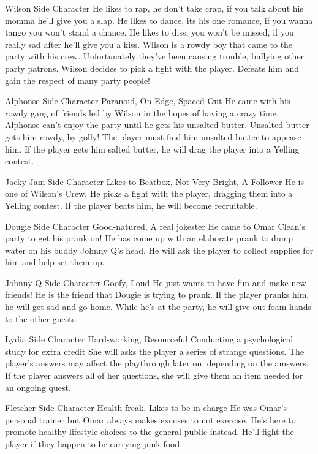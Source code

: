{Wilson}
{Side Character}
{He likes to rap, he don't take crap, if you talk about his momma he'll give you a slap. He likes to dance, its his one romance, if you wanna tango you won't stand a chance. He likes to diss, you won't be missed, if you really sad after he'll give you a kiss.}
{Wilson is a rowdy boy that came to the party with his crew. Unfortunately they've been causing trouble, bullying other party patrons.}
{Wilson decides to pick a fight with the player. Defeats him and gain the respect of many party people!}

{Alphonse}
{Side Character}
{Paranoid, On Edge, Spaced Out}
{He came with his rowdy gang of friends led by Wilson in the hopes of having a crazy time.}
{Alphonse can't enjoy the party until he gets his unsalted butter. Unsalted butter gets him rowdy, by golly! The player must find him unsalted butter to appease him. If the player gets him salted butter, he will drag the player into a Yelling contest.}

{Jacky-Jam}
{Side Character}
{Likes to Beatbox, Not Very Bright, A Follower}
{He is one of Wilson's Crew.}
{He picks a fight with the player, dragging them into a Yelling contest. If the player beats him, he will become recruitable.}

{Dougie}
{Side Character}
{Good-natured, A real jokester}
{He came to Omar Clean's party to get his prank on!}
{He has come up with an elaborate prank to dump water on his buddy Johnny Q's head. He will ask the player to collect supplies for him and help set them up.}

{Johnny Q}
{Side Character}
{Goofy, Loud}
{He just wants to have fun and make new friends!}
{He is the friend that Dougie is trying to prank. If the player pranks him, he will get sad and go home. While he's at the party, he will give out foam hands to the other guests.}

{Lydia}
{Side Character}
{Hard-working, Resourceful}
{Conducting a psychological study for extra credit}
{She will asks the player a series of strange questions. The player's answers may affect the playthrough later on, depending on the amswers. If the player answers all of her questions, she will give them an item needed for an ongoing quest.}

{Fletcher}
{Side Character}
{Health freak, Likes to be in charge}
{He was Omar's personal trainer but Omar always makes excuses to not exercise. He's here to promote healthy lifestyle choices to the general public instead.}
{He'll fight the player if they happen to be carrying junk food.}

